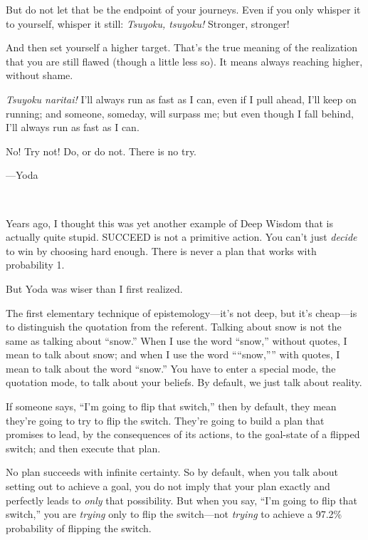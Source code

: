 {
 But do not let that be the endpoint of your journeys. Even if you
only whisper it to yourself, whisper it still: \textit{Tsuyoku,
tsuyoku!} Stronger, stronger!}

{
 And then set yourself a higher target. That's the
true meaning of the realization that you are still flawed (though a
little less so). It means always reaching higher, without shame.}

{
 \textit{Tsuyoku naritai!} I'll always run as fast
as I can, even if I pull ahead, I'll keep on running;
and someone, someday, will surpass me; but even though I fall behind,
I'll always run as fast as I can.}

\myendsectiontext


{
 No! Try not! Do, or do not. There is no try.}

{\raggedleft
 {}---Yoda
\par}


\bigskip

{
 ~}

{
 Years ago, I thought this was yet another example of Deep Wisdom
that is actually quite stupid. SUCCEED is not a primitive action. You
can't just \textit{decide} to win by choosing hard
enough. There is never a plan that works with probability 1.}

{
 But Yoda was wiser than I first realized.}

{
 The first elementary technique of
epistemology---it's not deep, but it's
cheap---is to distinguish the quotation from the referent. Talking
about snow is not the same as talking about
``snow.'' When I use the word
``snow,'' without quotes, I mean to
talk about snow; and when I use the word
````snow,''''
with quotes, I mean to talk about the word
``snow.'' You have to enter a
special mode, the quotation mode, to talk about your beliefs. By
default, we just talk about reality.}

{
 If someone says, ``I'm going to
flip that switch,'' then by default, they mean
they're going to try to flip the switch.
They're going to build a plan that promises to lead, by
the consequences of its actions, to the goal-state of a flipped switch;
and then execute that plan.}

{
 No plan succeeds with infinite certainty. So by default, when you
talk about setting out to achieve a goal, you do not imply that your
plan exactly and perfectly leads to \textit{only} that possibility. But
when you say, ``I'm going to flip that
switch,'' you are \textit{trying} only to flip the
switch---not \textit{trying} to achieve a 97.2\% probability of
flipping the switch.}

